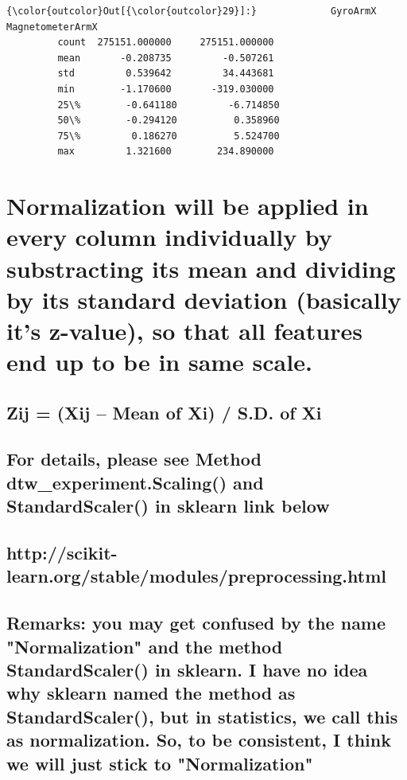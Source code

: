 \documentclass[11pt]{article}
\begin{document}
\begin{Verbatim}[commandchars=\\\{\}]
{\color{outcolor}Out[{\color{outcolor}29}]:}             GyroArmX  MagnetometerArmX
         count  275151.000000     275151.000000
         mean       -0.208735         -0.507261
         std         0.539642         34.443681
         min        -1.170600       -319.030000
         25\%        -0.641180         -6.714850
         50\%        -0.294120          0.358960
         75\%         0.186270          5.524700
         max         1.321600        234.890000
\end{Verbatim}
            
    \section{Normalization will be applied in every column individually by
substracting its mean and dividing by its standard deviation (basically
it's z-value), so that all features end up to be in same
scale.}\label{normalization-will-be-applied-in-every-column-individually-by-substracting-its-mean-and-dividing-by-its-standard-deviation-basically-its-z-value-so-that-all-features-end-up-to-be-in-same-scale.}

\subsection{Zij = (Xij -- Mean of Xi) / S.D. of
Xi}\label{zij-xij-mean-of-xi-s.d.-of-xi}

\subsection{For details, please see Method dtw\_experiment.Scaling() and
StandardScaler() in sklearn link
below}\label{for-details-please-see-method-dtw_experiment.scaling-and-standardscaler-in-sklearn-link-below}

\subsection{http://scikit-learn.org/stable/modules/preprocessing.html}\label{httpscikit-learn.orgstablemodulespreprocessing.html}

\subsection{Remarks: you may get confused by the name "Normalization"
and the method StandardScaler() in sklearn. I have no idea why sklearn
named the method as StandardScaler(), but in statistics, we call this as
normalization. So, to be consistent, I think we will just stick to
"Normalization"}\label{remarks-you-may-get-confused-by-the-name-normalization-and-the-method-standardscaler-in-sklearn.-i-have-no-idea-why-sklearn-named-the-method-as-standardscaler-but-in-statistics-we-call-this-as-normalization.-so-to-be-consistent-i-think-we-will-just-stick-to-normalization}
\end{document}
